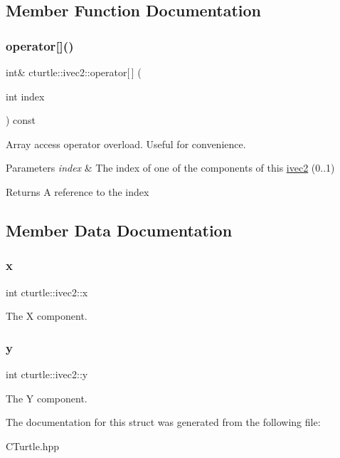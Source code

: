 \subsection{Member Function Documentation}
\mbox{\label{structcturtle_1_1ivec2_a83c6a5b1aab3c9a0a2374c843198067f}} 
\subsubsection{\texorpdfstring{operator[]()}{operator[]()}}
{\footnotesize\ttfamily int\& cturtle\+::ivec2\+::operator\mbox{[}$\,$\mbox{]} (\begin{DoxyParamCaption}\item[{int}]{index }\end{DoxyParamCaption}) const\hspace{0.3cm}{\ttfamily [inline]}}



Array access operator overload. Useful for convenience. 


\begin{DoxyParams}{Parameters}
{\em index} & The index of one of the components of this \hyperlink{structcturtle_1_1ivec2}{ivec2} (0..1) \\
\hline
\end{DoxyParams}
\begin{DoxyReturn}{Returns}
A reference to the index 
\end{DoxyReturn}


\subsection{Member Data Documentation}
\mbox{\label{structcturtle_1_1ivec2_acf8e72e8e3847b3a62f35bfbe588b637}} 
\subsubsection{\texorpdfstring{x}{x}}
{\footnotesize\ttfamily int cturtle\+::ivec2\+::x}

The X component. \mbox{\label{structcturtle_1_1ivec2_a20914f8516f2f9b8e88e81cdf8415897}} 
\subsubsection{\texorpdfstring{y}{y}}
{\footnotesize\ttfamily int cturtle\+::ivec2\+::y}

The Y component. 

The documentation for this struct was generated from the following file\+:\begin{DoxyCompactItemize}
\item 
C\+Turtle.\+hpp\end{DoxyCompactItemize}
